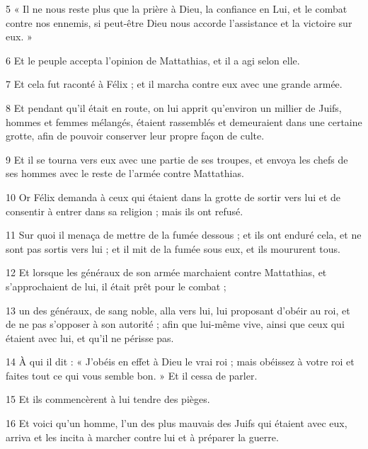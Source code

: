 \par 5 « Il ne nous reste plus que la prière à Dieu, la confiance en Lui, et le combat contre nos ennemis, si peut-être Dieu nous accorde l'assistance et la victoire sur eux. »

\par 6 Et le peuple accepta l'opinion de Mattathias, et il a agi selon elle.

\par 7 Et cela fut raconté à Félix ; et il marcha contre eux avec une grande armée.

\par 8 Et pendant qu'il était en route, on lui apprit qu'environ un millier de Juifs, hommes et femmes mélangés, étaient rassemblés et demeuraient dans une certaine grotte, afin de pouvoir conserver leur propre façon de culte.

\par 9 Et il se tourna vers eux avec une partie de ses troupes, et envoya les chefs de ses hommes avec le reste de l'armée contre Mattathias.

\par 10 Or Félix demanda à ceux qui étaient dans la grotte de sortir vers lui et de consentir à entrer dans sa religion ; mais ils ont refusé.

\par 11 Sur quoi il menaça de mettre de la fumée dessous ; et ils ont enduré cela, et ne sont pas sortis vers lui ; et il mit de la fumée sous eux, et ils moururent tous.

\par 12 Et lorsque les généraux de son armée marchaient contre Mattathias, et s'approchaient de lui, il était prêt pour le combat ;

\par 13 un des généraux, de sang noble, alla vers lui, lui proposant d'obéir au roi, et de ne pas s'opposer à son autorité ; afin que lui-même vive, ainsi que ceux qui étaient avec lui, et qu'il ne périsse pas.

\par 14 À qui il dit : « J’obéis en effet à Dieu le vrai roi ; mais obéissez à votre roi et faites tout ce qui vous semble bon. » Et il cessa de parler.

\par 15 Et ils commencèrent à lui tendre des pièges.

\par 16 Et voici qu'un homme, l'un des plus mauvais des Juifs qui étaient avec eux, arriva et les incita à marcher contre lui et à préparer la guerre.

